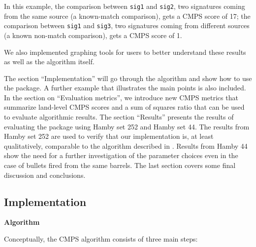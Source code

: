 In this example, the comparison between \texttt{sig1} and \texttt{sig2},
two signatures coming from the same source (a known-match comparison),
gets a CMPS score of 17; the comparison between \texttt{sig1} and
\texttt{sig3}, two signatures coming from different sources (a known
non-match comparison), gets a CMPS score of 1.

We also implemented graphing tools for users to better understand these
results as well as the algorithm itself.

The section ``Implementation'' will go through the algorithm and show
how to use the  package. A further example that illustrates
the main points is also included. In the section on ``Evaluation
metrics'', we introduce new CMPS metrics that summarize land-level CMPS
scores and a sum of squares ratio that can be used to evaluate
algorithmic results. The section ``Results'' presents the results of
evaluating the  package using Hamby set 252 and Hamby set 44.
The results from Hamby set 252 are used to verify that our
implementation is, at least qualitatively, comparable to the algorithm
described in \citet{cmps}. Results from Hamby 44 show the need for a
further investigation of the parameter choices even in the case of
bullets fired from the same barrels. The last section covers some final
discussion and conclusions.

\hypertarget{implementation}{%
\subsection{Implementation}\label{implementation}}

\textbf{Algorithm}

Conceptually, the CMPS algorithm consists of three main steps:

